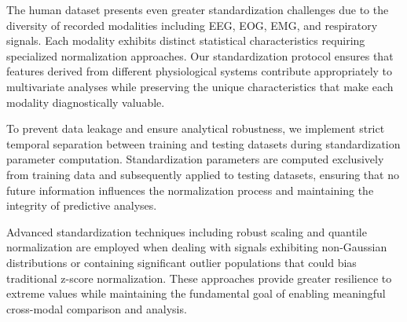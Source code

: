 \documentclass[a4paper,12pt,twoside]{article}
\begin{document}
The human dataset presents even greater standardization challenges due to the diversity of recorded modalities including EEG, EOG, EMG, and respiratory signals. Each modality exhibits distinct statistical characteristics requiring specialized normalization approaches. Our standardization protocol ensures that features derived from different physiological systems contribute appropriately to multivariate analyses while preserving the unique characteristics that make each modality diagnostically valuable.

To prevent data leakage and ensure analytical robustness, we implement strict temporal separation between training and testing datasets during standardization parameter computation. Standardization parameters are computed exclusively from training data and subsequently applied to testing datasets, ensuring that no future information influences the normalization process and maintaining the integrity of predictive analyses.

Advanced standardization techniques including robust scaling and quantile normalization are employed when dealing with signals exhibiting non-Gaussian distributions or containing significant outlier populations that could bias traditional z-score normalization. These approaches provide greater resilience to extreme values while maintaining the fundamental goal of enabling meaningful cross-modal comparison and analysis.  
\end{document}
